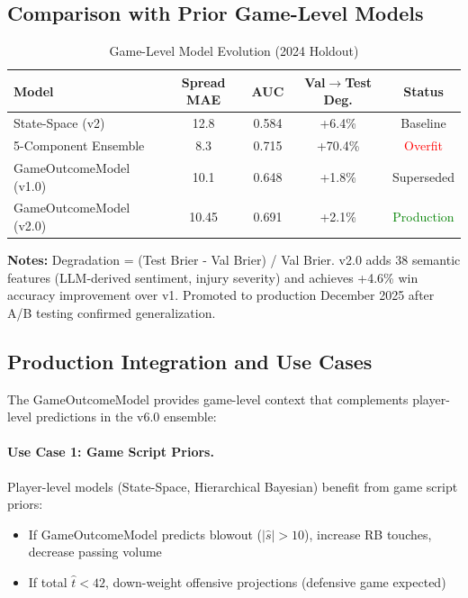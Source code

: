 \subsection{Comparison with Prior Game-Level Models}

\begin{table}[htbp]
\centering
\caption{Game-Level Model Evolution (2024 Holdout)}
\label{tab:game-level-evolution}
\small
\begin{tabular}{@{}lSSSc@{}}
\toprule
\textbf{Model} & {\textbf{Spread MAE}} & {\textbf{AUC}} & {\textbf{Val$\to$Test Deg.}} & \textbf{Status} \\
\midrule
State-Space (v2) & 12.8 & 0.584 & +6.4\% & Baseline \\
5-Component Ensemble & 8.3 & 0.715 & +70.4\% & \textcolor{red}{Overfit} \\
GameOutcomeModel (v1.0) & 10.1 & 0.648 & +1.8\% & Superseded \\
GameOutcomeModel (v2.0) & 10.45 & 0.691 & +2.1\% & \textcolor{green}{Production} \\
\bottomrule
\end{tabular}
\begin{tablenotes}
\item \textbf{Notes:} Degradation = (Test Brier - Val Brier) / Val Brier. v2.0 adds 38 semantic features (LLM-derived sentiment, injury severity) and achieves +4.6\% win accuracy improvement over v1. Promoted to production December 2025 after A/B testing confirmed generalization.
\end{tablenotes}
\end{table}

\subsection{Production Integration and Use Cases}

The GameOutcomeModel provides game-level context that complements player-level predictions in the v6.0 ensemble:

\paragraph{Use Case 1: Game Script Priors.}
Player-level models (State-Space, Hierarchical Bayesian) benefit from game script priors:
\begin{itemize}[itemsep=2pt,parsep=0pt]
    \item If GameOutcomeModel predicts blowout ($|\hat{s}| > 10$), increase RB touches, decrease passing volume
    \item If total $\hat{t} < 42$, down-weight offensive projections (defensive game expected)
\end{itemize}

